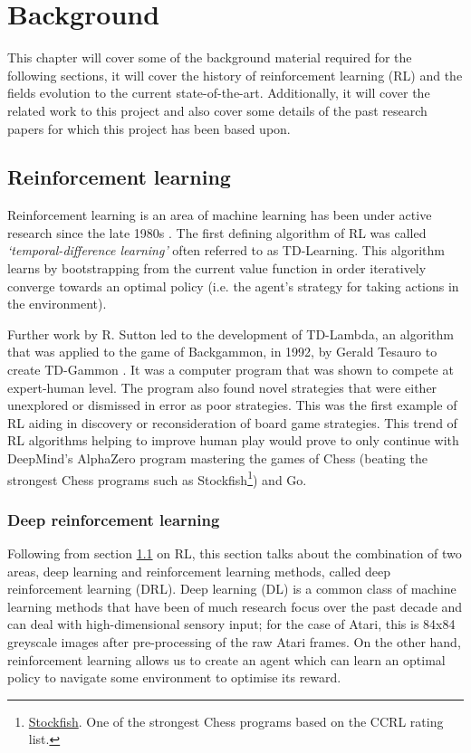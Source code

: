 \chapter{Background}
\label{cha:bg}

This chapter will cover some of the background material required for the following sections, it will cover the history of reinforcement learning (RL) and the fields evolution to the current state-of-the-art. Additionally, it will cover the related work to this project and also cover some details of the past research papers for which this project has been based upon.

\section{Reinforcement learning}
\label{bg:sec:rl}
Reinforcement learning is an area of machine learning has been under active research since the late 1980s \cite{watkins-phd}. The first defining algorithm of RL was called \textit{`temporal-difference learning'} often referred to as TD-Learning. This algorithm learns by bootstrapping from the current value function in order iteratively converge towards an optimal policy (i.e. the agent's strategy for taking actions in the environment).

Further work by R. Sutton led to the development of TD-Lambda, an algorithm that was applied to the game of Backgammon, in 1992, by Gerald Tesauro to create TD-Gammon \cite{td-gammon}. It was a computer program that was shown to compete at expert-human level. The program also found novel strategies that were either unexplored or dismissed in error as poor strategies. This was the first example of RL aiding in discovery or reconsideration of board game strategies. This trend of RL algorithms helping to improve human play would prove to only continue with DeepMind's AlphaZero program mastering the games of Chess (beating the strongest Chess programs such as Stockfish\footnote{\href{https://stockfishchess.org}{Stockfish}. One of the strongest Chess programs based on the CCRL rating list.}) and Go.

\subsection{Deep reinforcement learning}
\label{bg:sec:deeprl}
Following from section \ref{bg:sec:rl} on RL, this section talks about the combination of two areas, deep learning and reinforcement learning methods, called deep reinforcement learning (DRL). Deep learning (DL) is a common class of machine learning methods that have been of much research focus over the past decade and can deal with high-dimensional sensory input; for the case of Atari, this is 84x84 greyscale images after pre-processing of the raw Atari frames. On the other hand, reinforcement learning allows us to create an agent which can learn an optimal policy to navigate some environment to optimise its reward.

